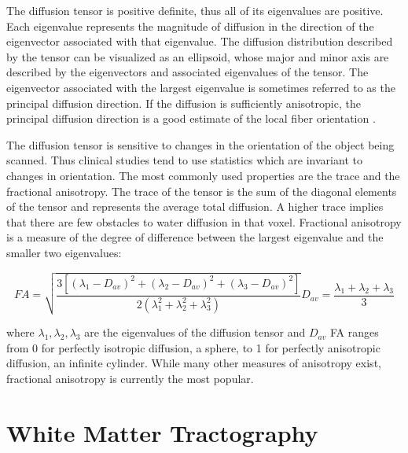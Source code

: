The diffusion tensor is positive definite, thus all of its eigenvalues are positive.  Each eigenvalue represents the magnitude of diffusion in the direction of the eigenvector associated with that eigenvalue.  The diffusion distribution described by the tensor can be visualized as an ellipsoid, whose major and minor axis are described by the eigenvectors and associated eigenvalues of the tensor.  The eigenvector associated with the largest eigenvalue is sometimes referred to as the principal diffusion direction.  If the diffusion is sufficiently anisotropic, the principal diffusion direction is a good estimate of the local fiber orientation \cite{Lin01}. %

The diffusion tensor is sensitive to changes in the orientation of the object being scanned. Thus clinical studies tend to use statistics which are invariant to changes in orientation.  The most commonly used properties are the trace and the fractional anisotropy.  The trace of the tensor is the sum of the diagonal elements of the tensor and represents the average total diffusion.  A higher trace implies that there are few obstacles to water diffusion in that voxel.  Fractional anisotropy is a measure of the degree of difference between the largest eigenvalue and the smaller two eigenvalues:

\begin{equation}
FA=\sqrt{\frac{3[(\lambda_1-D_{av})^2 + (\lambda_2-D_{av})^2 + (\lambda_3-D_{av})^2]}
{2(\lambda_1^2+\lambda_2^2+\lambda_3^2)}}
D_{av}=\frac{\lambda_1+\lambda_2+\lambda_3}{3}
 \label{eq:FA}
\end{equation}

where $\lambda_1,\lambda_2,\lambda_3$ are the eigenvalues of the diffusion tensor and $D_{av}$
FA ranges from 0 for perfectly isotropic diffusion, a sphere, to 1 for perfectly anisotropic diffusion, an infinite cylinder.  While many other measures of anisotropy exist, fractional anisotropy is currently the most popular.


\section{White Matter Tractography}



